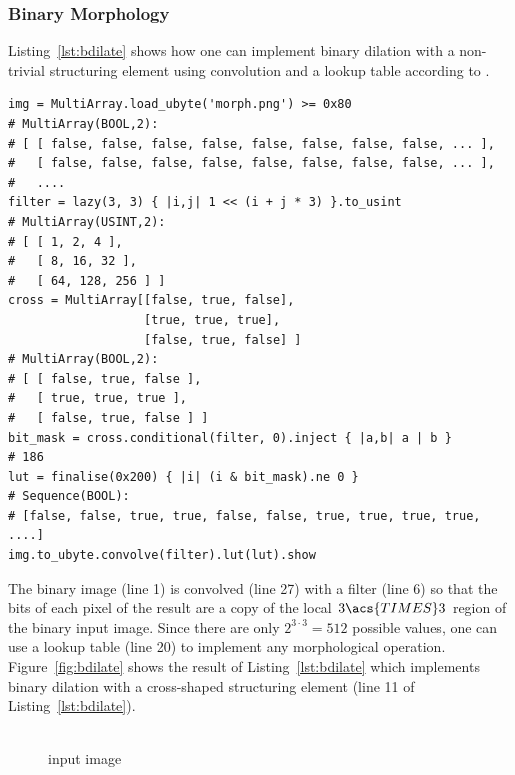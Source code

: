 \documentclass[12pt,a4paper,oneside,openright]{book}
\newcommand{\fig}[1]{Figure~\ref{fig:#1}}
\newcommand{\lst}[1]{Listing~\ref{lst:#1}}
\begin{document}
\begin{CJK}{UTF8}{}
\subsubsection{Binary Morphology}
\lst{bdilate} shows how one can implement binary dilation with a non-trivial structuring element using convolution and a lookup table according to \citet{binmorph}.
\lstset{language=Ruby,frame=single,numbers=left}
\begin{lstlisting}[float,caption={Implementing a structuring element using convolution and a lookup table},escapechar=\$,label=lst:bdilate]
img = MultiArray.load_ubyte('morph.png') >= 0x80
# MultiArray(BOOL,2):
# [ [ false, false, false, false, false, false, false, false, ... ],
#   [ false, false, false, false, false, false, false, false, ... ],
#   ....
filter = lazy(3, 3) { |i,j| 1 << (i + j * 3) }.to_usint
# MultiArray(USINT,2):
# [ [ 1, 2, 4 ],
#   [ 8, 16, 32 ],
#   [ 64, 128, 256 ] ]
cross = MultiArray[[false, true, false],
                   [true, true, true],
                   [false, true, false] ]
# MultiArray(BOOL,2):
# [ [ false, true, false ],
#   [ true, true, true ],
#   [ false, true, false ] ]
bit_mask = cross.conditional(filter, 0).inject { |a,b| a | b }
# 186
lut = finalise(0x200) { |i| (i & bit_mask).ne 0 }
# Sequence(BOOL):
# [false, false, true, true, false, false, true, true, true, true, ....]
img.to_ubyte.convolve(filter).lut(lut).show
\end{lstlisting}
The binary image (line 1) is convolved (line 27) with a filter (line 6) so that the bits of each pixel of the result are a copy of the local $3\acs{TIMES} 3$ region of the binary input image. Since there are only $2^{3\cdot 3}=512$ possible values, one can use a lookup table (line 20) to implement any morphological operation. \fig{bdilate} shows the result of \lst{bdilate} which implements binary dilation with a cross-shaped structuring element (line 11 of \lst{bdilate}).
\begin{figure}[htbp]
  \begin{center}
    \begin{minipage}[t]{.3\textwidth}
      \begin{center}
        \\
        input image
      \end{center}
    \end{minipage}

\end{center}
\end{figure}
\end{CJK}
\end{document}
